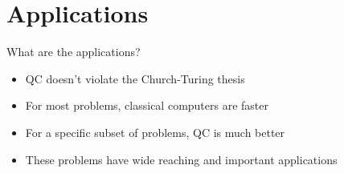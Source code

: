 \documentclass[14pt]{beamer}
\begin{document}

\section{Applications}
\begin{frame}{What are the applications?}
\begin{itemize}
	\item QC doesn't violate the Church-Turing thesis
	\item For most problems, classical computers are faster
	\item For a specific subset of problems, QC is much better
	\item These problems have wide reaching and important applications
\end{itemize}
\end{frame}
\end{document}
